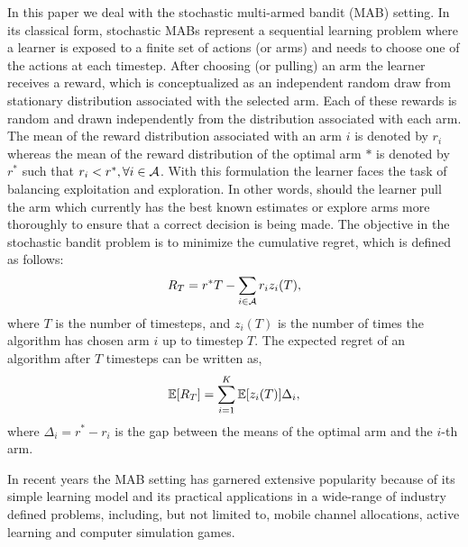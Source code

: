 In this paper we deal with the stochastic multi-armed bandit (MAB) setting. In its classical form, stochastic MABs represent a sequential learning problem where a learner is exposed to a finite set of actions (or arms) and needs to choose one of the actions at each timestep. After choosing (or pulling) an arm the learner  receives a reward, which is conceptualized as an independent random draw from stationary distribution associated with the selected arm. Each of these rewards is random and drawn independently from the distribution associated with each arm. The mean of the reward distribution associated with an arm $i$ is denoted by $r_i$ whereas the mean of the reward distribution of the optimal arm $*$ is denoted by $r^*$ such that $r_i < r^*, \forall i\in \mathcal{A}$. With this formulation the learner faces the task of balancing exploitation and exploration. In other words, should the learner pull the arm which currently has the best known estimates or explore arms more thoroughly to ensure that a correct decision is being made. The objective in the stochastic bandit problem is to minimize the cumulative regret, which is defined as follows:
\begin{align*}
R_{T}=r^{*}T - \sum_{i\in \mathcal{A}} r_{i}z_{i}(T),
\end{align*}
where $T$ is the number of timesteps, and  $z_{i}(T)$ is the number of times the algorithm has chosen arm $i$ up to timestep $T$.
The expected regret of an algorithm after $T$ timesteps can be written as,
\begin{align*}
\mathbb{E}[R_{T}]= \sum_{i=1}^K \mathbb{E}[z_i (T)] \Delta_i,
\end{align*}
where $\Delta_{i}=r^{*}-r_{i}$ is the gap between the means of the optimal arm and the $i$-th arm.


	In recent years the MAB setting has garnered extensive popularity because of its simple learning  model and its practical applications in a wide-range of industry defined problems, including, but not limited to, mobile channel allocations, active learning and computer simulation games. 
